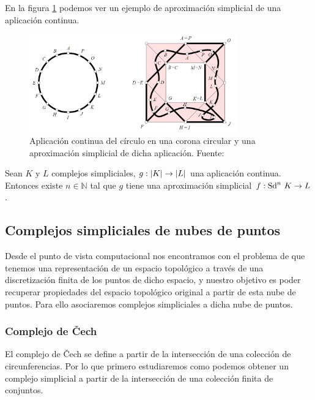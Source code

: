 En la figura \ref{ref:aproxSimp} podemos ver un ejemplo de aproximación simplicial de una aplicación continua.

\begin{figure}[!ht]
\centering
\includegraphics[width=0.8\textwidth]{include/figuras/aproximacionSimplicial.png} 
\caption{Aplicación continua del círculo en una corona circular y una aproximación simplicial de dicha aplicación. Fuente: \cite{libroEH}}
\label{ref:aproxSimp}
\end{figure}

\begin{theorem}
\label{ref:teoremaAproximacionSimplicial}
\begin{sloppypar}
Sean $K$ y $L$ complejos simpliciales, ${g: \lvert K\rvert \to \lvert L\rvert}$ una aplicación continua. Entonces existe $n \in \mathbb{N}$ tal que $g$ tiene una aproximación simplicial ${f: {\rm Sd}^{n}\ K \to L}$  \cite{libroEH}.
\end{sloppypar}
\end{theorem}

\subsection{Complejos simpliciales de nubes de puntos}
Desde el punto de vista computacional nos encontramos con el problema de que tenemos una representación de un espacio topológico a través de una discretización finita de los puntos de dicho espacio, y nuestro objetivo es poder recuperar propiedades del espacio topológico original a partir de esta nube de puntos. Para ello asociaremos complejos simpliciales a dicha nube de puntos.

\subsubsection*{Complejo de \v{C}ech}
El complejo de \v{C}ech se define a partir de la intersección de una colección de circunferencias. Por lo que primero estudiaremos como podemos obtener un complejo simplicial a partir de la intersección de una colección finita de conjuntos.

